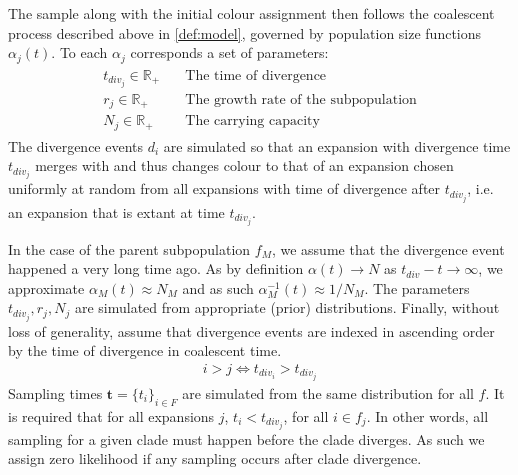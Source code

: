 \documentclass{report}
\newcommand{\R}{\mathbb{R}}
\theoremstyle{definition}
\begin{document}
The sample along with the initial colour assignment then follows the coalescent process described above in \ref{def:model}, governed by population size functions $\alpha_{j}(t)$. To each $\alpha_{j}$ corresponds a set of parameters:
\begin{gather}
\begin{aligned}
t_{div_{j}}\in\R_+ \quad&\text{The time of divergence}\\
r_j\in\R_+\quad&\text{The growth rate of the subpopulation}\\
N_j\in\R_+\quad&\text{The carrying capacity}
\end{aligned}
\end{gather}
The divergence events $d_i$ are simulated so that an expansion with divergence time $t_{div_j}$ merges with and thus changes colour to that of an expansion chosen uniformly at random from all expansions with time of divergence after $t_{div_j}$, i.e. an expansion that is extant at time $t_{div_j}$.

In the case of the parent subpopulation $f_{M}$, we assume that the divergence event happened a very long time ago. As by definition $\alpha(t) \rightarrow N$ as $t_{div}-t\rightarrow \infty$, we approximate $\alpha_{M}(t) \approx N_{M}$ and as such $\alpha^{-1}_{M}(t) \approx 1/N_{M}$. The parameters $t_{div_{j}}, r_j, N_j$ are simulated from appropriate (prior) distributions.
Finally, without loss of generality, assume that divergence events are indexed in ascending order by the time of divergence in coalescent time.
\begin{gather}
i > j \Leftrightarrow t_{div_i} > t_{div_j}  
\end{gather}
Sampling times $\mathbf{t}=\{t_i\}_{i\in F}$ are simulated from the same distribution for all $f$. It is required that for all expansions $j$, $t_i < t_{div_j}$, for all $i \in f_j$. In other words, all sampling for a given clade must happen before the clade diverges. As such we assign zero likelihood if any sampling occurs after clade divergence.
\end{document}
